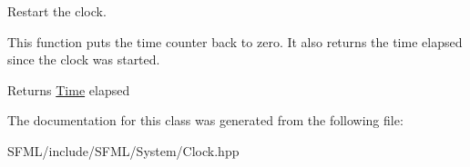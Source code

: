 Restart the clock. 

This function puts the time counter back to zero. It also returns the time elapsed since the clock was started.

\begin{DoxyReturn}{Returns}
\mbox{\hyperlink{classsf_1_1_time}{Time}} elapsed \begin{DoxyVerb}\end{DoxyVerb}
 
\end{DoxyReturn}


The documentation for this class was generated from the following file\+:\begin{DoxyCompactItemize}
\item 
S\+F\+M\+L/include/\+S\+F\+M\+L/\+System/Clock.\+hpp\end{DoxyCompactItemize}
